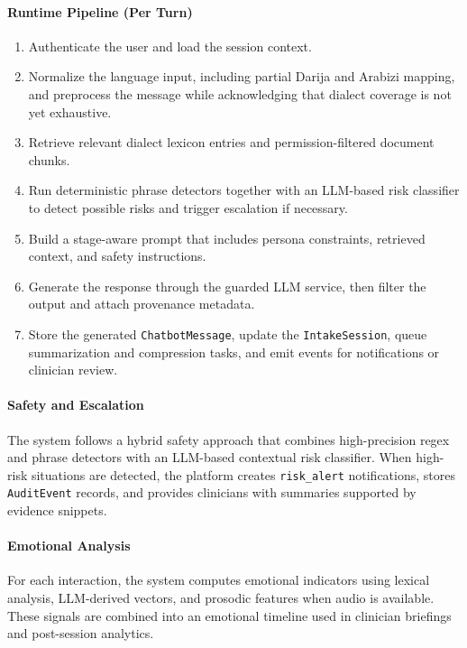 \documentclass[a4paper,12pt]{report}
\begin{document}
\paragraph{Runtime Pipeline (Per Turn)}
\begin{enumerate}[leftmargin=*, label=\arabic*.]
  \item Authenticate the user and load the session context.
  \item Normalize the language input, including partial Darija and Arabizi mapping, and preprocess the message while acknowledging that dialect coverage is not yet exhaustive.
  \item Retrieve relevant dialect lexicon entries and permission-filtered document chunks.
  \item Run deterministic phrase detectors together with an LLM-based risk classifier to detect possible risks and trigger escalation if necessary.
  \item Build a stage-aware prompt that includes persona constraints, retrieved context, and safety instructions.
  \item Generate the response through the guarded LLM service, then filter the output and attach provenance metadata.
  \item Store the generated \texttt{ChatbotMessage}, update the \texttt{IntakeSession}, queue summarization and compression tasks, and emit events for notifications or clinician review.
\end{enumerate}

\paragraph{Safety and Escalation}
The system follows a hybrid safety approach that combines high-precision regex and phrase detectors with an LLM-based contextual risk classifier. When high-risk situations are detected, the platform creates \texttt{risk\_alert} notifications, stores \texttt{AuditEvent} records, and provides clinicians with summaries supported by evidence snippets.

\paragraph{Emotional Analysis}
For each interaction, the system computes emotional indicators using lexical analysis, LLM-derived vectors, and prosodic features when audio is available. These signals are combined into an emotional timeline used in clinician briefings and post-session analytics.
\end{document}
